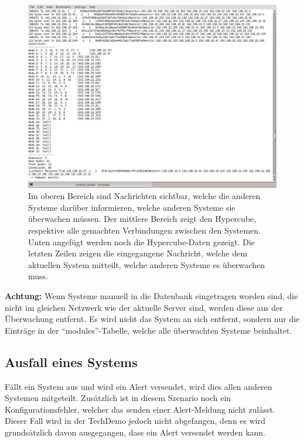 \begin{figure}[H]
  \centering
  \includegraphics[width=0.9\linewidth]{images/theorie/amods_rebuild}
  \caption[Erstellen von DummyHosts und Rebuild des Hypercubes]{Im oberen Bereich sind Nachrichten sichtbar, welche die anderen Systeme dar\"uber informieren, welche anderen Systeme sie \"uberwachen m\"ussen. Der mittlere Bereich zeigt den Hypercube, respektive alle gemachten Verbindungen zwischen den Systemen. Unten angef\"ugt werden noch die Hypercube-Daten gezeigt. Die letzten Zeilen zeigen die eingegangene Nachricht, welche dem aktuellen System mitteilt, welche anderen Systeme es \"uberwachen muss.}
  \label{fig:nat-source}
\end{figure}

\textbf{Achtung:} Wenn Systeme manuell in die Datenbank eingetragen worden sind, die nicht im gleichen Netzwerk wie der aktuelle Server sind, werden diese aus der \"Uberwachung entfernt. Es wird nicht das System an sich entfernt, sondern nur die Eintr\"age in der "`modules"'-Tabelle, welche alle \"uberwachten Systeme beinhaltet.

\subsection{Ausfall eines Systems}
F\"allt ein System aus und wird ein Alert versendet, wird dies allen anderen Systemen mitgeteilt. Zus\"atzlich ist in diesem Szenario noch ein Konfigurationsfehler, welcher das senden einer Alert-Meldung nicht zul\"asst. Dieser Fall wird in der TechDemo jedoch nicht abgefangen, denn es wird grunds\"atzlich davon ausgegangen, dass ein Alert versendet werden kann.

